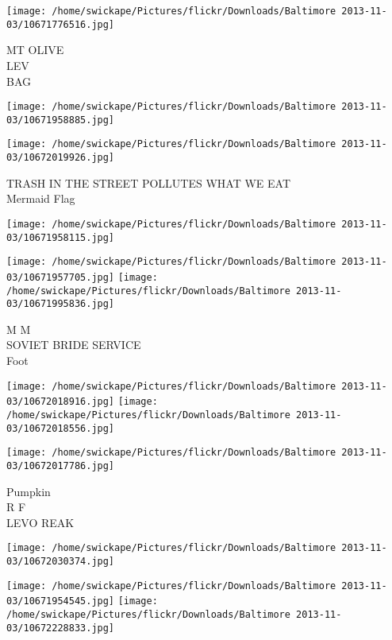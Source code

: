 \documentclass[10pt,letterpaper]{article}
\begin{document}
\vspace{0.25in}
\texttt{[image: /home/swickape/Pictures/flickr/Downloads/Baltimore 2013-11-03/10671776516.jpg]}

MT OLIVE\\
LEV\\
BAG\\
\pagebreak

\texttt{[image: /home/swickape/Pictures/flickr/Downloads/Baltimore 2013-11-03/10671958885.jpg]}

\vspace{0.25in}
\texttt{[image: /home/swickape/Pictures/flickr/Downloads/Baltimore 2013-11-03/10672019926.jpg]}

TRASH IN THE STREET POLLUTES WHAT WE EAT\\
Mermaid Flag\\
\pagebreak

\texttt{[image: /home/swickape/Pictures/flickr/Downloads/Baltimore 2013-11-03/10671958115.jpg]}

\vspace{0.25in}
\texttt{[image: /home/swickape/Pictures/flickr/Downloads/Baltimore 2013-11-03/10671957705.jpg]}
\texttt{[image: /home/swickape/Pictures/flickr/Downloads/Baltimore 2013-11-03/10671995836.jpg]}

M M\\
SOVIET BRIDE SERVICE\\
Foot\\
\pagebreak

\texttt{[image: /home/swickape/Pictures/flickr/Downloads/Baltimore 2013-11-03/10672018916.jpg]}
\texttt{[image: /home/swickape/Pictures/flickr/Downloads/Baltimore 2013-11-03/10672018556.jpg]}

\texttt{[image: /home/swickape/Pictures/flickr/Downloads/Baltimore 2013-11-03/10672017786.jpg]}

Pumpkin\\
R F\\
LEVO REAK\\
\pagebreak

\texttt{[image: /home/swickape/Pictures/flickr/Downloads/Baltimore 2013-11-03/10672030374.jpg]}

\vspace{0.25in}
\texttt{[image: /home/swickape/Pictures/flickr/Downloads/Baltimore 2013-11-03/10671954545.jpg]}
\texttt{[image: /home/swickape/Pictures/flickr/Downloads/Baltimore 2013-11-03/10672228833.jpg]}
\end{document}

